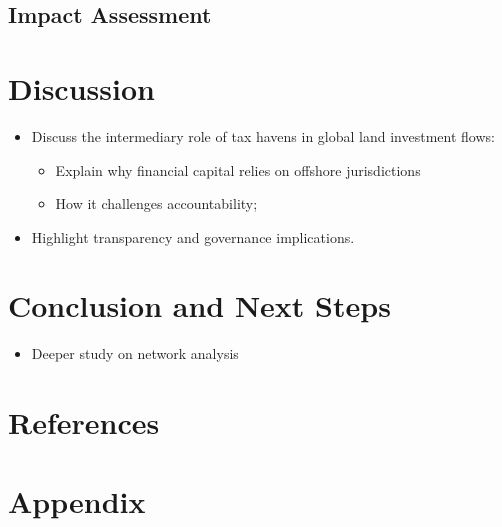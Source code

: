 \documentclass[
  letterpaper,
  DIV=11,
  numbers=noendperiod]{scrreprt}
\providecommand{\tightlist}{%
  \setlength{\itemsep}{0pt}\setlength{\parskip}{0pt}}
\begin{document}
\section{Impact Assessment}\label{impact-assessment}


\chapter{Discussion}\label{discussion}

\begin{itemize}
\item
  Discuss the intermediary role of tax havens in global land investment
  flows:

  \begin{itemize}
  \item
    Explain why financial capital relies on offshore jurisdictions
  \item
    How it challenges accountability;
  \end{itemize}
\item
  Highlight transparency and governance implications.
\end{itemize}


\chapter{Conclusion and Next Steps}\label{conclusion-and-next-steps}

\begin{itemize}
\tightlist
\item
  Deeper study on network analysis
\end{itemize}


\chapter*{References}\label{references}


\label{refs}


\chapter*{Appendix}\label{appendix}
\end{document}

